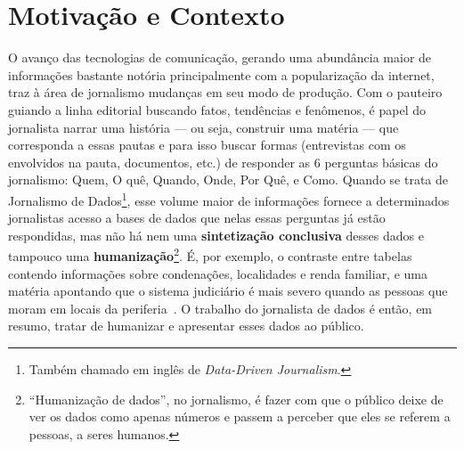 \section{Motivação e Contexto~\label{sec:Motivação-e-Contexto}}


O avanço das tecnologias de comunicação, gerando uma abundância maior de
informações bastante notória principalmente com a popularização da internet,
traz à área de jornalismo mudanças em seu modo de produção. Com o pauteiro
guiando a linha editorial buscando fatos, tendências e fenômenos, é papel do
jornalista narrar uma história --- ou seja, construir uma matéria ---  que
corresponda a essas pautas e para isso buscar formas (entrevistas com os
envolvidos na pauta, documentos, etc.) de responder as 6 perguntas básicas do
jornalismo: Quem, O quê, Quando, Onde, Por Quê, e Como. Quando se trata de
Jornalismo de Dados\footnote{Também chamado em inglês de \textit{Data-Driven
Journalism}.}, esse volume maior de informações fornece a determinados
jornalistas acesso a bases de dados que nelas essas perguntas já estão
respondidas, mas não há nem uma \textbf{sintetização conclusiva} desses dados e
tampouco uma \textbf{humanização}\footnote{``Humanização de dados'', no
jornalismo, é fazer com que o público deixe de ver os dados como apenas números
e passem a perceber que eles se referem a pessoas, a seres humanos.}. É, por
exemplo, o contraste entre tabelas contendo informações sobre condenações,
localidades e renda familiar, e uma matéria apontando que o sistema judiciário
é mais severo quando as pessoas que moram em locais da
periferia~\cite{news:sentenças-mais-severas-para-periferia}. O trabalho do
jornalista de dados é então, em resumo, tratar de humanizar e apresentar esses
dados ao público.

